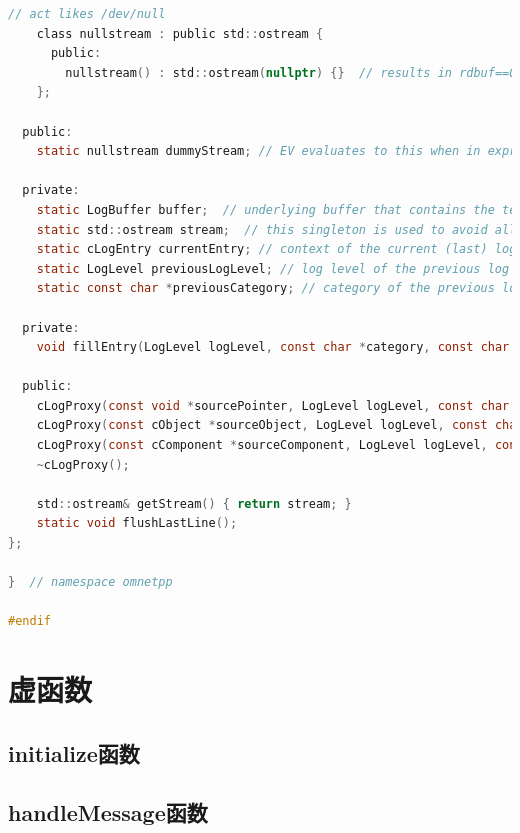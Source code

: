 \begin{lstlisting}[language=c]
    // act likes /dev/null
    class nullstream : public std::ostream {
      public:
        nullstream() : std::ostream(nullptr) {}  // results in rdbuf==0 and badbit==true
    };

  public:
    static nullstream dummyStream; // EV evaluates to this when in express mode (getEnvir()->disabled())

  private:
    static LogBuffer buffer;  // underlying buffer that contains the text that has been written so far
    static std::ostream stream;  // this singleton is used to avoid allocating a new stream each time a log statement executes
    static cLogEntry currentEntry; // context of the current (last) log statement that has been executed.
    static LogLevel previousLogLevel; // log level of the previous log statement
    static const char *previousCategory; // category of the previous log statement

  private:
    void fillEntry(LogLevel logLevel, const char *category, const char *sourceFile, int sourceLine, const char *sourceFunction);

  public:
    cLogProxy(const void *sourcePointer, LogLevel logLevel, const char *category, const char *sourceFile, int sourceLine, const char *sourceFunction);
    cLogProxy(const cObject *sourceObject, LogLevel logLevel, const char *category, const char *sourceFile, int sourceLine, const char *sourceFunction);
    cLogProxy(const cComponent *sourceComponent, LogLevel logLevel, const char *category, const char *sourceFile, int sourceLine, const char *sourceFunction);
    ~cLogProxy();

    std::ostream& getStream() { return stream; }
    static void flushLastLine();
};

}  // namespace omnetpp

#endif

\end{lstlisting}

\section{虚函数}
\label{虚函数}

\subsection{initialize函数}
\label{initialize函数}

\subsection{handleMessage函数}
\label{handlemessage函数}

